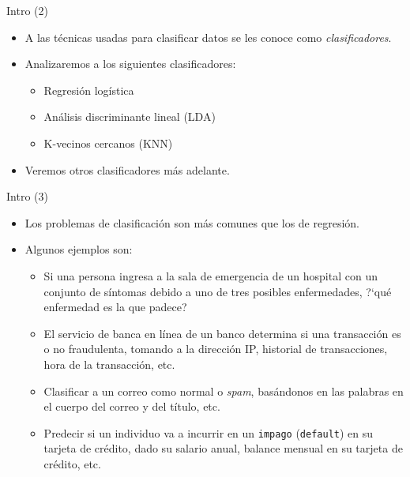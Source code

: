 \documentclass[usenames,dvipsnames]{beamer} %
\newcommand\vari[1]{\textcolor{BrickRed}{\texttt{#1}}}
\newcommand\defi[1]{\textcolor{NavyBlue}{\textit{#1}}}
\begin{document}
\begin{frame}{Intro (2)}
	\begin{itemize}
		\item A las t\'ecnicas usadas para clasificar datos se les conoce como \defi{clasificadores}.
		\item Analizaremos a	 los siguientes clasificadores:
		\begin{itemize}
			\item Regresi\'on log\'istica
			\item An\'alisis discriminante lineal (LDA)
			\item K-vecinos cercanos (KNN)
		\end{itemize}
		\item Veremos otros clasificadores m\'as adelante. 
	\end{itemize}
\end{frame}

\begin{frame}{Intro (3)}
	\begin{itemize}
		\item Los problemas de clasificaci\'on son m\'as comunes que los de regresi\'on.
		\item Algunos ejemplos son:
		\begin{itemize}
			\item Si una persona ingresa a la sala de emergencia de un hospital con un conjunto de s\'intomas debido a uno de tres posibles enfermedades, ?`qu\'e enfermedad es la que padece?
			\item El servicio de banca en l\'inea de un banco determina si una transacci\'on es o no  fraudulenta, tomando a la direcci\'on IP, historial de transacciones, hora de la transacci\'on, etc.
			\item Clasificar a un correo como normal o \textit{spam}, bas\'andonos en las palabras en el cuerpo del correo y del t\'itulo, etc.
			\item Predecir si un individuo va a incurrir en un \vari{impago} (\vari{default}) en su tarjeta de cr\'edito, dado su salario anual, balance mensual en su tarjeta de cr\'edito, etc.
		\end{itemize}
	\end{itemize}
\end{frame}
\end{document}
